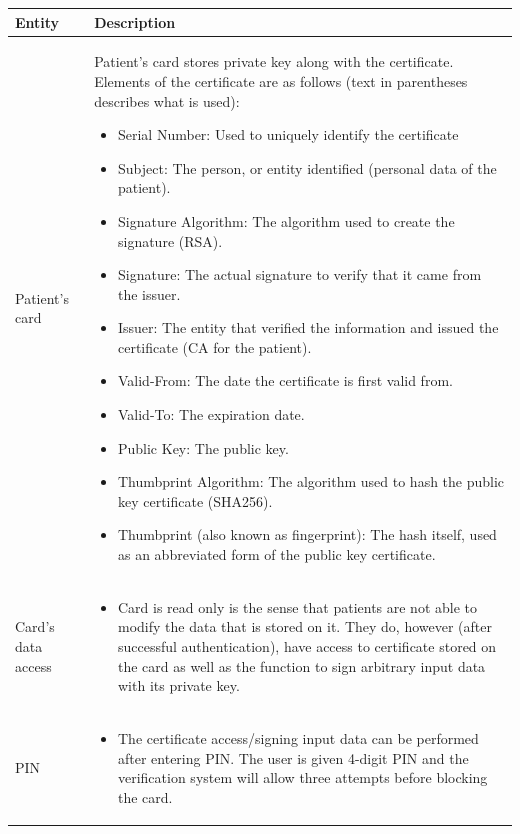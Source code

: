 \begin{tabularx}{\textwidth}{ |p{2.5cm}|X| }
	\hline
	\textbf{Entity} &  \textbf{Description}\\
	\hline	
Patient's card & Patient's card stores private key along with the certificate. Elements of the certificate are as follows (text in parentheses describes what is used): 
\begin{itemize}
\item Serial Number: Used to uniquely identify the certificate
\item Subject: The person, or entity identified (personal data of the patient).
\item Signature Algorithm: The algorithm used to create the signature (RSA).
\item Signature: The actual signature to verify that it came from the issuer.
\item Issuer: The entity that verified the information and issued the certificate (CA for the patient).
\item Valid-From: The date the certificate is first valid from.
\item Valid-To: The expiration date.
\item Public Key: The public key.
\item Thumbprint Algorithm: The algorithm used to hash the public key certificate (SHA256).
\item Thumbprint (also known as fingerprint): The hash itself, used as an abbreviated form of the public key certificate.
\end{itemize} \\
\hline
	
Card's data \newline access &
\begin{itemize}
\item 
Card is read only is the sense that patients are not able to modify the data that is stored on it. They do, however (after successful authentication), have access to certificate stored on the card as well as the function to sign arbitrary input data with its private key.
\end{itemize} \\
\hline

PIN &
\begin{itemize}
\item The certificate access/signing input data can be performed after entering PIN. The user is given 4-digit PIN and the verification system will allow three attempts before blocking the card.
\end{itemize} \\
\hline
\end{tabularx}

